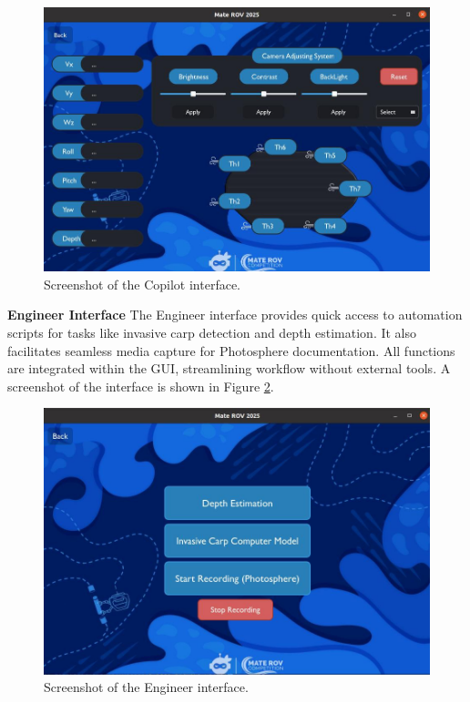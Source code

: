 \begin{figure}[ht]
    \centering
    \includegraphics[width=0.8\columnwidth]{Sections/2Design Rationale/images/Copilot_interface.jpeg}
    \caption{Screenshot of the Copilot interface.}
    \label{fig:copilot_interface}
\end{figure}

\vspace{0.2cm}
\textbf{Engineer Interface}
The Engineer interface provides quick access to automation scripts for tasks like invasive carp detection and depth estimation. It also facilitates seamless media capture for Photosphere documentation. All functions are integrated within the GUI, streamlining workflow without external tools. A screenshot of the interface is shown in Figure \ref{fig:Engineer_interface}.

\begin{figure}[h]
    \centering
    \includegraphics[width=0.8\columnwidth]{Sections/2Design Rationale/images/Engineer_interface.jpeg}
    \caption{Screenshot of the Engineer interface.}
    \label{fig:Engineer_interface}
\end{figure}

